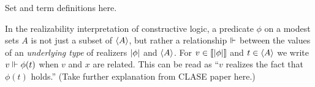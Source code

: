 Set and term definitions here.

In the realizability interpretation of constructive logic, a predicate
$\phi$ on a modest sets $A$ is not just a subset of $\langle A \rangle$, but
rather a relationship $\Vdash$ between the values of an \emph{underlying
  type} of realizers $|\phi|$ and $\langle A \rangle$. For $v \in
[\![|\phi|]\!]$ and $t \in \langle A \rangle$ we write $v \Vdash \phi(t)$
when $v$ and $x$ are related. This can be read as ``$v$ realizes the
fact that $\phi(t)$ holds.'' (Take further explanation from CLASE
paper here.)


